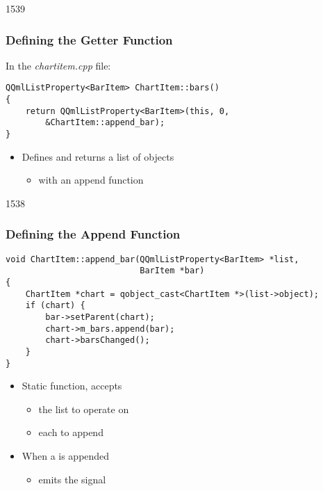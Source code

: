 \begin{slide}[fragile]{1539}\frametitle{Defining the Getter Function}

In the \textit{chartitem.cpp} file:

\vspace*{0.5em}
\begin{lstlisting}
QQmlListProperty<BarItem> ChartItem::bars()
{
    return QQmlListProperty<BarItem>(this, 0,
        &ChartItem::append_bar);
}
\end{lstlisting}

\vspace*{0.5em}
\begin{itemize}
\item Defines and returns a list of  objects
  \begin{itemize}
  \item with an append function
  \end{itemize}
\end{itemize}

\end{slide}

\begin{slide}[fragile]{1538}\frametitle{Defining the Append Function}

\begin{lstlisting}
void ChartItem::append_bar(QQmlListProperty<BarItem> *list,
                           BarItem *bar)
{
    ChartItem *chart = qobject_cast<ChartItem *>(list->object);
    if (chart) {
        bar->setParent(chart);
        chart->m_bars.append(bar);
        chart->barsChanged();
    }
}
\end{lstlisting}

\vspace*{0.5em}
\begin{itemize}
\item Static function, accepts
  \begin{itemize}
  \item the list to operate on
  \item each  to append
  \end{itemize}
\vspace*{0.5em}
\item When a  is appended
  \begin{itemize}
  \item emits the  signal
  \end{itemize}
\end{itemize}

\end{slide}

